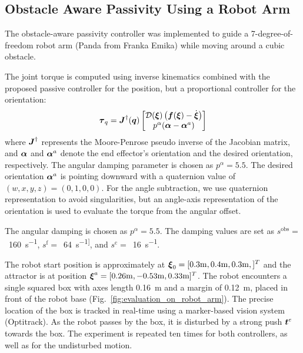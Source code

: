 \subsection{Obstacle Aware Passivity Using a Robot Arm}
The obstacle-aware passivity controller was implemented to guide a 7-degree-of-freedom robot arm (Panda from Franka Emika) while moving around a cubic obstacle. 

The joint torque is computed using inverse kinematics combined with the proposed passive controller for the position, but a proportional controller for the orientation:
\begin{equation}
	\boldsymbol{\tau}_q = \boldsymbol{J}^{\dag}(\boldsymbol{q}) 
	\begin{bmatrix} \mathcal{D}(\boldsymbol{\xi}) \left( \boldsymbol{f}(\boldsymbol{\xi}) - \dot{\boldsymbol{\xi}} \right) \\  p^\alpha (\boldsymbol{\alpha} - \boldsymbol{\alpha}^a) \end{bmatrix}
\end{equation}
where $\boldsymbol{J}^{\dag}$ represents the Moore-Penrose pseudo inverse of the Jacobian matrix, and $\boldsymbol{\alpha}$ and $\boldsymbol{\alpha}^a$ denote the end effector's orientation and the desired orientation, respectively. The angular damping parameter is chosen as $p^\alpha = 5.5$.
The desired orientation $\boldsymbol{\alpha}^a$ is pointing downward with a quaternion value of $(w, x, y, z) = (0, 1, 0, 0)$. For the angle subtraction, we use quaternion representation to avoid singularities, but an angle-axis representation of the orientation is used to evaluate the torque from the angular offset.

The angular damping is chosen as $p^\alpha = 5.5$.
The damping values are set as
$s^{\mathrm{obs}}=$~\qty{160}{s^{-1}},
$s^{\mathrm{f}}=$~\qty{64}{s^{-1]}}, and
$s^{\mathrm{c}}=$~\qty{16}{s^{-1}}.

The robot start position is approximately at $\boldsymbol{\xi}_0 = [0.3\mathrm{m}, 0.4\mathrm{m}, 0.3\mathrm{m},]^T$ and the attractor is at position $\boldsymbol{\xi}^a = [0.26 \mathrm{m}, -0.53\mathrm{m}, 0.33\mathrm{m}]^T$.
The robot encounters a single squared box with axes length \qty{0.16}{m} and a margin of \qty{0.12}{m}, placed in front of the robot base (Fig.~\ref{fig:evaluation_on_robot_arm}). The precise location of the box is tracked in real-time using a marker-based vision system (Optitrack). As the robot passes by the box, it is disturbed by a strong push $\boldsymbol{t}^e$ towards the box. The experiment is repeated ten times for both controllers, as well as for the undisturbed motion.

